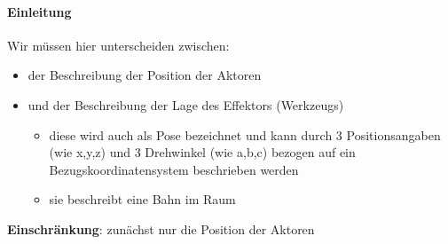 %
%
%
%




{ 
	
  \framesubtitle{Einleitung}	
  
  \begin{figure}[!h]
    \centering
    
  \end{figure}

  Wir müssen hier unterscheiden zwischen:

  \begin{itemize}
    \item der Beschreibung der Position der Aktoren
    \item und der Beschreibung der Lage des Effektors (Werkzeugs)
      \begin{itemize}
        \item diese wird auch als Pose bezeichnet und kann durch 3 Positionsangaben (wie x,y,z) und 3 Drehwinkel (wie a,b,c) bezogen auf ein Bezugskoordinatensystem beschrieben werden
        \item sie beschreibt eine Bahn im Raum
      \end{itemize}
  \end{itemize}

  \textbf{Einschränkung}: zunächst nur die Position der Aktoren
}


